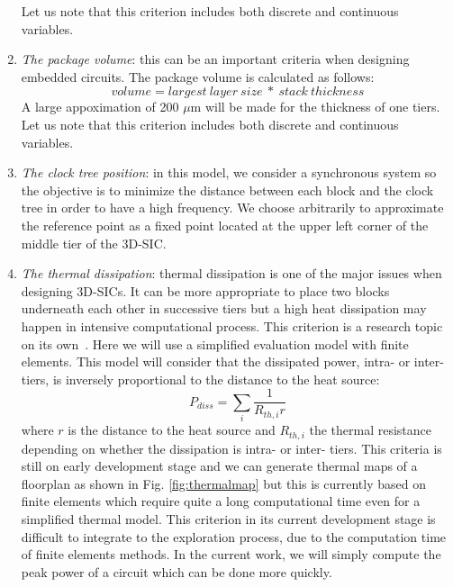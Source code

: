 \begin{enumerate}
Let us note that this criterion includes both discrete and continuous variables.
\item \textit{The package volume}: this can be an important criteria when designing embedded circuits. The package volume is calculated as follows:
\begin{equation}
volume=largest~layer~size~*~stack~thickness
\label{eqn:volume}
\end{equation}
A large appoximation of 200 $\mu$m will be made for the thickness of one tiers.
Let us note that this criterion includes both discrete and continuous variables.
\item \textit{The clock tree position}: in this model, we consider a synchronous system so the objective is to minimize the distance between each block and the clock tree in order to have a high frequency. We choose arbitrarily to approximate the reference point as a fixed point located at the upper left corner of the middle tier of the 3D-SIC.
\item \textit{The thermal dissipation}: thermal dissipation is one of the major issues when designing 3D-SICs. It can be more appropriate to place two blocks underneath each other in successive tiers but a high heat dissipation may happen in intensive computational process. This criterion is a research topic on its own~\cite{1112292, 1486402}. Here we will use a simplified evaluation model with finite elements. This model will consider that the dissipated power, intra- or inter- tiers, is inversely proportional to the distance to the heat source:
\begin{equation}
P_{diss} = \sum_i \frac{1}{R_{th, i}r}
\label{eqn:pdiss}
\end{equation}
where $r$ is the distance to the heat source and $R_{th, i}$ the thermal resistance depending on whether the dissipation is intra- or inter- tiers.
This criteria is still on early development stage and we can generate thermal maps of a floorplan as shown in Fig. \ref{fig:thermalmap} but this is currently based on finite elements \cite{4263187} which require quite a long computational time even for a simplified thermal model.
This criterion in its current development stage is difficult to integrate to the exploration process, due to the computation time of finite elements methods. In the current work, we will simply compute the peak power of a circuit which can be done more quickly.


\end{enumerate}
